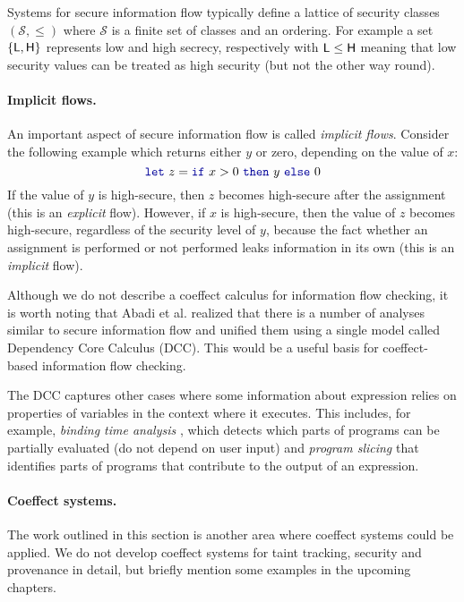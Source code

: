Systems for secure information flow typically define a lattice of security classes $(\mathcal{S}, \leq)$
where $\mathcal{S}$ is a finite set of classes and an ordering. For example a set $\{\textnormal{\sffamily L}, \textnormal{\sffamily H}\}$ 
represents low and high secrecy, respectively with $\textnormal{\sffamily L} \leq \textnormal{\sffamily H}$ meaning that low security
values can be treated as high security (but not the other way round).

\paragraph{Implicit flows.}
An important aspect of secure information flow is called \emph{implicit flows}. Consider the following
example which returns either $y$ or zero, depending on the value of $x$:
%
\begin{equation*}
\kvd{let}~z = \kvd{if}~x>0~\kvd{then}~y~\kvd{else}~0
\end{equation*}
%
If the value of $y$ is high-secure, then $z$ becomes high-secure after the assignment
(this is an \emph{explicit} flow). However, if $x$ is high-secure, then the value of
$z$ becomes high-secure, regardless of the security level of $y$, because the fact whether an 
assignment is performed or not performed leaks information in its own (this is an 
\emph{implicit} flow).

Although we do not describe a coeffect calculus for information flow checking, it is worth noting 
that Abadi et al. \cite{app-dcc} realized that there is a number of analyses similar to secure information 
flow and unified them using a single model called Dependency Core Calculus (DCC). This would be
a useful basis for coeffect-based information flow checking.

The DCC captures other cases where some information about expression relies on properties of variables
in the context where it executes.  This includes, for example, \emph{binding time analysis}
\cite{app-binding-time-analysis}, which detects which parts of programs can be partially evaluated
(do not depend on user input) and \emph{program slicing} \cite{app-slicing-survey} that identifies
parts of programs that contribute to the output of an expression.

\paragraph{Coeffect systems.}
The work outlined in this section is another area where coeffect systems could be applied.
We do not develop coeffect systems for taint tracking, security and provenance in detail,
but briefly mention some examples in the upcoming chapters.

